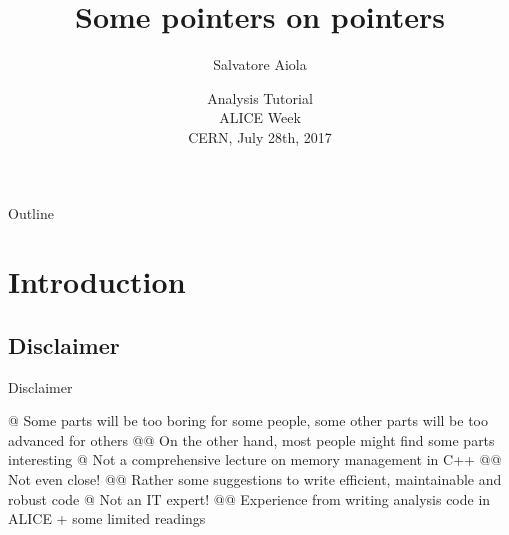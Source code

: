 \documentclass[xcolor={usenames,dvipsnames}]{beamer}
\title[Some pointers on pointers] %
{Some pointers on pointers}
\author[Salvatore Aiola]%
{Salvatore Aiola}
\institute[Yale University] %
{Yale University}
\date[July 28th, 2017] %
{Analysis Tutorial \\
ALICE Week \\
CERN, July 28th, 2017}
\begin{document}
\begin{frame}
  \titlepage
\end{frame}

\begin{frame}{Outline}
   \tableofcontents
\end{frame}








\section{Introduction}

\subsection{Disclaimer}

\begin{frame}[fragile]{Disclaimer}
\begin{easylist}[itemize]
@ Some parts will be too boring for some people, some other parts will be too advanced for others
@@ On the other hand, most people might find some parts interesting
@ Not a comprehensive lecture on memory management in C++
@@ Not even close!
@@ Rather some suggestions to write efficient, maintainable and robust code
@ Not an IT expert! 
@@ Experience from writing analysis code in ALICE + some limited readings
\end{easylist}
\end{frame}
\end{document}
